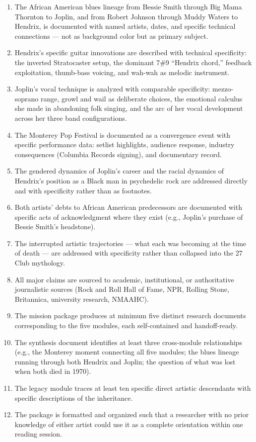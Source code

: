\documentclass[11pt,letterpaper]{article}
\begin{document}
\begin{enumerate}[leftmargin=*, label=\textbf{SC-\arabic*:}]
  \item The African American blues lineage from Bessie Smith through Big Mama Thornton to Joplin, and from Robert Johnson through Muddy Waters to Hendrix, is documented with named artists, dates, and specific technical connections --- not as background color but as primary subject.
  \item Hendrix's specific guitar innovations are described with technical specificity: the inverted Stratocaster setup, the dominant 7\#9 ``Hendrix chord,'' feedback exploitation, thumb-bass voicing, and wah-wah as melodic instrument.
  \item Joplin's vocal technique is analyzed with comparable specificity: mezzo-soprano range, growl and wail as deliberate choices, the emotional calculus she made in abandoning folk singing, and the arc of her vocal development across her three band configurations.
  \item The Monterey Pop Festival is documented as a convergence event with specific performance data: setlist highlights, audience response, industry consequences (Columbia Records signing), and documentary record.
  \item The gendered dynamics of Joplin's career and the racial dynamics of Hendrix's position as a Black man in psychedelic rock are addressed directly and with specificity rather than as footnotes.
  \item Both artists' debts to African American predecessors are documented with specific acts of acknowledgment where they exist (e.g., Joplin's purchase of Bessie Smith's headstone).
  \item The interrupted artistic trajectories --- what each was becoming at the time of death --- are addressed with specificity rather than collapsed into the 27 Club mythology.
  \item All major claims are sourced to academic, institutional, or authoritative journalistic sources (Rock and Roll Hall of Fame, NPR, Rolling Stone, Britannica, university research, NMAAHC).
  \item The mission package produces at minimum five distinct research documents corresponding to the five modules, each self-contained and handoff-ready.
  \item The synthesis document identifies at least three cross-module relationships (e.g., the Monterey moment connecting all five modules; the blues lineage running through both Hendrix and Joplin; the question of what was lost when both died in 1970).
  \item The legacy module traces at least ten specific direct artistic descendants with specific descriptions of the inheritance.
  \item The package is formatted and organized such that a researcher with no prior knowledge of either artist could use it as a complete orientation within one reading session.
\end{enumerate}
\end{document}
